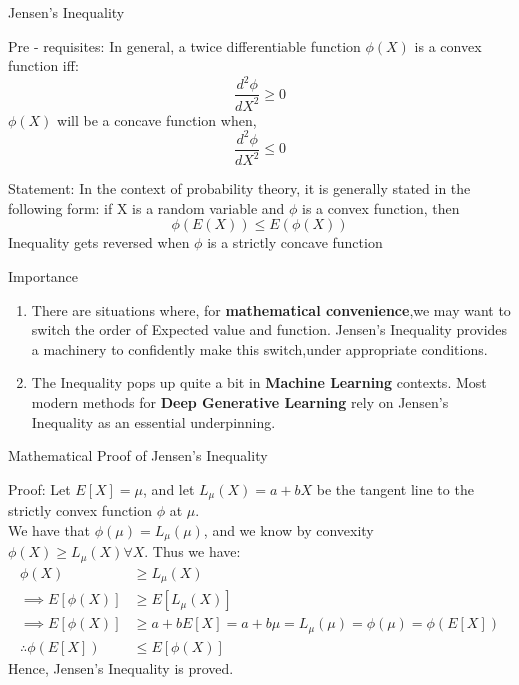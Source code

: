 \documentclass{beamer}
\begin{document}
\begin{frame}{Jensen's Inequality}
\begin{block}{Pre - requisites:}
In general, a twice differentiable function $\phi(X)$ is a  convex function iff:
\begin{equation*}
    \frac{d^2 \phi}{dX^2} \ge 0
\end{equation*}
$\phi(X)$ will be a concave function when, 
\begin{equation*}
    \frac{d^2 \phi}{dX^2} \le 0
\end{equation*}
\end{block}
\begin{block}{Statement:}
In the context of probability theory, it is generally stated in the following form: if X is a random variable and $\phi$ is a convex function, then
\begin{equation*}
    \phi(E(X)) \le E(\phi(X)) 
\end{equation*} 
Inequality gets reversed when $\phi$ is a strictly concave function
\end{block}
\end{frame}
\begin{frame}
\begin{block}{Importance}
\begin{enumerate}
    \item There are situations where, for \textbf{mathematical convenience},we may want to switch the order of Expected value and function. Jensen's Inequality provides a machinery to confidently make this switch,under appropriate conditions. \\
    \item The Inequality pops up quite a bit in \textbf{Machine Learning} contexts. Most modern methods for \textbf{Deep Generative Learning} rely on Jensen's Inequality as an essential underpinning.
\end{enumerate}
\end{block}
\end{frame}
\begin{frame}{Mathematical Proof of Jensen's Inequality}
\begin{block}{Proof:}
Let $E[X] = \mu$, and let $L_\mu(X) = a + bX$ be the tangent line to the strictly convex function $\phi$ at $\mu$. \\
We have that $\phi(\mu) = L_\mu(\mu)$, and we know by convexity $\phi(X) \ge L_\mu(X)  \forall X$. Thus we have:
\begin{align}
    \phi(X) &\ge L_\mu(X) \\
    \implies E[\phi(X)] &\ge E[L_\mu(X)] \\
    \implies E[\phi(X)] &\ge a + bE[X] = a + b\mu = L_\mu(\mu) = \phi(\mu) = \phi(E[X]) \\
    \therefore \phi(E[X]) &\le E[\phi(X)]
\end{align}
\centering Hence, Jensen's Inequality is proved.
\end{block}
\end{frame}
\end{document}
